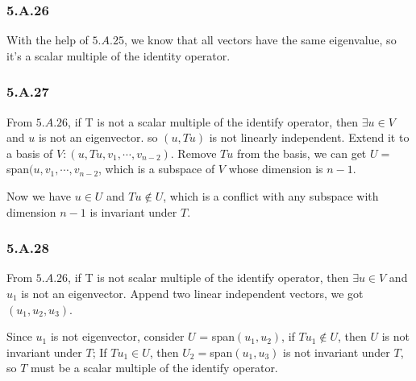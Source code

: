 \subsubsection*{5.A.26}

With the help of $5.A.25$, we know that all vectors have the same eigenvalue, so it's a scalar multiple of the identity operator.

\subsubsection*{5.A.27}

From $5.A.26$, if T is not a scalar multiple of the identify operator, then $\exists u\in V$ and $u$ is not an eigenvector. so $(u, Tu)$ is not linearly independent. Extend it to a basis of $V: (u, Tu, v_{1}, \cdots, v_{n-2})$. Remove $Tu$ from the basis, we can get $U = $ span$(u, v_{1}, \cdots, v_{n-2}$, which is a subspace of $V$ whose dimension is $n-1$. 

Now we have $u\in U$ and $Tu \notin U$, which is a conflict with any subspace with dimension $n-1$ is invariant under $T$.

\subsubsection*{5.A.28}

From $5.A.26$, if T is not scalar multiple of the identify operator, then $\exists u\in V$ and $u_{1}$ is not an eigenvector. Append two linear independent vectors, we got $(u_{1}, u_{2}, u_{3})$.

Since $u_{1}$ is not eigenvector, consider $U$ = span$(u_{1}, u_{2})$, if $Tu_{1} \notin U$, then $U$ is not invariant under $T$; If $Tu_{1} \in U$, then $U_{2}=$span$(u_{1}, u_{3})$ is not invariant under $T$, so $T$ must be a scalar multiple of the identify operator.

\newpage